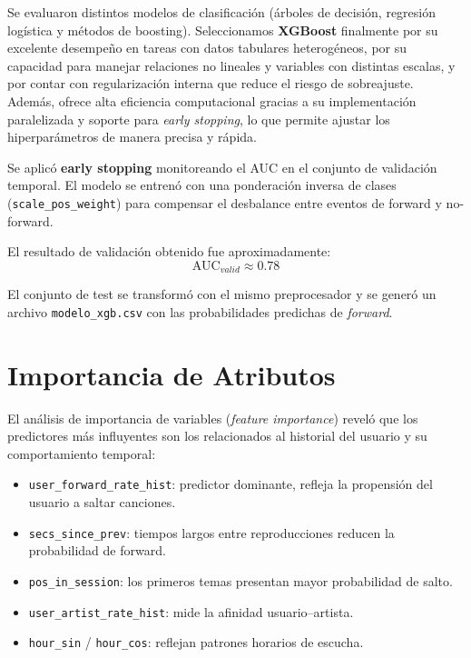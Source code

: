 \documentclass[12pt,a4paper]{article}
\begin{document}
Se evaluaron distintos modelos de clasificación (árboles de decisión, regresión logística y métodos de boosting). 
Seleccionamos \textbf{XGBoost} finalmente por su excelente desempeño en tareas con datos tabulares heterogéneos, por su capacidad para manejar relaciones no lineales y variables con distintas escalas, y por contar con regularización interna que reduce el riesgo de sobreajuste. 
Además, ofrece alta eficiencia computacional gracias a su implementación paralelizada y soporte para \textit{early stopping}, lo que permite ajustar los hiperparámetros de manera precisa y rápida.

Se aplicó \textbf{early stopping} monitoreando el AUC en el conjunto de validación temporal.  
El modelo se entrenó con una ponderación inversa de clases (\texttt{scale\_pos\_weight}) para compensar el desbalance entre eventos de forward y no-forward.

El resultado de validación obtenido fue aproximadamente:
\[ \text{AUC}_{valid} \approx 0.78 \]

El conjunto de test se transformó con el mismo preprocesador y se generó un archivo \texttt{modelo\_xgb.csv} con las probabilidades predichas de \textit{forward}.


\section{Importancia de Atributos}

El análisis de importancia de variables (\textit{feature importance}) reveló que los predictores más influyentes son los relacionados al historial del usuario y su comportamiento temporal:

\begin{itemize}
    \item \texttt{user\_forward\_rate\_hist}: predictor dominante, refleja la propensión del usuario a saltar canciones.
    \item \texttt{secs\_since\_prev}: tiempos largos entre reproducciones reducen la probabilidad de forward.
    \item \texttt{pos\_in\_session}: los primeros temas presentan mayor probabilidad de salto.
    \item \texttt{user\_artist\_rate\_hist}: mide la afinidad usuario–artista.
    \item \texttt{hour\_sin} / \texttt{hour\_cos}: reflejan patrones horarios de escucha.
\end{itemize}
\end{document}
